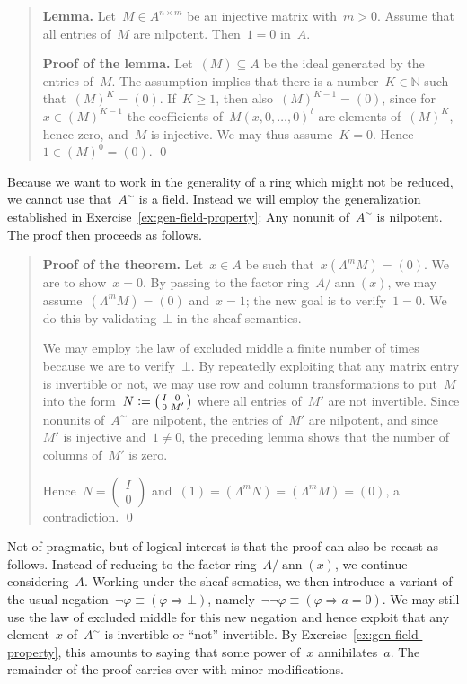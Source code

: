 \documentclass{ws-rv9x6}
\newcommand{\NN}{\mathbb{N}}
\newcommand{\defeq}{\vcentcolon=}
\renewcommand{\_}{\mathpunct{.}}
\newcommand{\?}{\,{:}\,}
\newcommand{\ann}{\operatorname{ann}}
\newcommand{\negg}{\neg\!\!\!\neg}
\begin{document}
\begin{quote}
\textbf{Lemma.} Let~$M \in A^{n \times m}$ be an injective matrix with~$m > 0$. Assume that all entries
of~$M$ are nilpotent. Then~$1 = 0$ in~$A$.

\textbf{Proof of the lemma.} Let~$(M) \subseteq A$ be the ideal generated by the entries
of~$M$. The assumption implies that there is a number~$K \in \NN$ such that~$(M)^K = (0)$.
If~$K \geq 1$, then also~$(M)^{K-1} = (0)$, since for~$x \in (M)^{K-1}$ the
coefficients of~$M (x,0,\ldots,0)^t$ are elements of~$(M)^K$, hence zero,
and~$M$ is injective. We may thus assume~$K = 0$. Hence~$1 \in (M)^0 = (0)$. \qed
\end{quote}
Because we want to work in the generality of
a ring which might not be reduced, we cannot use that~$A^\sim$ is a field.
Instead we will employ the generalization established in
Exercise~\ref{ex:gen-field-property}: Any nonunit of~$A^\sim$ is nilpotent. The
proof then proceeds as follows.
\begin{quote}
\textbf{Proof of the theorem.} Let~$x \in A$ be such that~$x (\Lambda^m M) = (0)$. We are to
show~$x = 0$. By passing to the factor ring~$A/\ann(x)$, we may
assume~$(\Lambda^m M) = (0)$ and~$x = 1$; the new goal is to verify~$1 = 0$. We
do this by validating~$\bot$ in the sheaf semantics.

We may employ the law of excluded middle a finite number of times because we
are to verify~$\bot$. By repeatedly exploiting that any matrix entry is
invertible or not, we may use row and column transformations to put~$M$ into
the form~$N \defeq \left(\begin{smallmatrix}I&0\\0&M'\end{smallmatrix}\right)$ where all
entries of~$M'$ are not invertible. Since nonunits of~$A^\sim$ are nilpotent, the entries of~$M'$ are
nilpotent, and since~$M'$ is injective and~$1 \neq 0$, the preceding lemma
shows that the number of columns of~$M'$ is zero.

Hence~$N = \left(\begin{smallmatrix}I\\0\end{smallmatrix}\right)$ and~$(1) =
(\Lambda^m N) = (\Lambda^m M) = (0)$, a contradiction. \qed
\end{quote}

\begin{remark}Not of pragmatic, but of logical interest is that the proof can
also be recast as follows. Instead of reducing to the factor ring~$A/\ann(x)$,
we continue considering~$A$. Working under the sheaf sematics, we then
introduce a variant of the usual negation~$\neg\varphi \equiv (\varphi
\Rightarrow \bot)$, namely~$\negg\varphi \equiv (\varphi \Rightarrow a = 0)$.
We may still use the law of excluded middle for this new negation and hence
exploit that any element~$x$ of~$A^\sim$ is invertible or ``not'' invertible. By
Exercise~\ref{ex:gen-field-property}, this amounts to saying that some power
of~$x$ annihilates~$a$. The remainder of the proof carries over with minor
modifications.
\end{remark}
\end{document}
